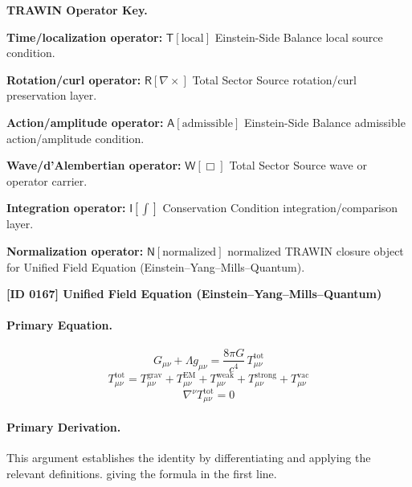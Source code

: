 \par\vspace{0.45\baselineskip}
\noindent\begin{minipage}[t]{\linewidth}
\begingroup
\small
\raggedright
\textbf{TRAWIN Operator Key.}\par
\noindent\textbf{Time/localization operator:} $\mathsf{T}\!\left[\mathrm{local}\right]$ Einstein-Side Balance local source condition.\par
\noindent\textbf{Rotation/curl operator:} $\mathsf{R}\!\left[\nabla\times\right]$ Total Sector Source rotation/curl preservation layer.\par
\noindent\textbf{Action/amplitude operator:} $\mathsf{A}\!\left[\mathrm{admissible}\right]$ Einstein-Side Balance admissible action/amplitude condition.\par
\noindent\textbf{Wave/d'Alembertian operator:} $\mathsf{W}\!\left[\Box\right]$ Total Sector Source wave or operator carrier.\par
\noindent\textbf{Integration operator:} $\mathsf{I}\!\left[\int\right]$ Conservation Condition integration/comparison layer.\par
\noindent\textbf{Normalization operator:} $\mathsf{N}\!\left[\mathrm{normalized}\right]$ normalized TRAWIN closure object for Unified Field Equation (Einstein--Yang--Mills--Quantum).\par
\endgroup
\end{minipage}

\clearpage
\noindent\textbf{[ID 0167] Unified Field Equation (Einstein--Yang--Mills--Quantum)}\par
\vspace{0.35em}
\paragraph{Primary Equation.}
\[
G_{\mu\nu}+\Lambda g_{\mu\nu}
=
\frac{8\pi G}{c^4}\,T_{\mu\nu}^{\mathrm{tot}}
\]
\[
T_{\mu\nu}^{\mathrm{tot}}
=
T_{\mu\nu}^{\mathrm{grav}}+
T_{\mu\nu}^{\mathrm{EM}}+
T_{\mu\nu}^{\mathrm{weak}}+
T_{\mu\nu}^{\mathrm{strong}}+
T_{\mu\nu}^{\mathrm{vac}}
\]
\[
\nabla^{\nu}T_{\mu\nu}^{\mathrm{tot}}=0
\]

\paragraph{Primary Derivation.}
This argument establishes the identity by differentiating and applying the relevant definitions. giving the formula in the first line.

